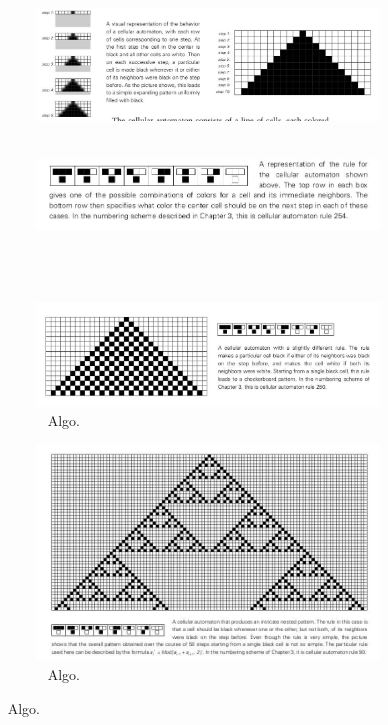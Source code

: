 \documentclass[16pt,spanish]{article}
\begin{document}
\begin{figure}[h!]
\begin{subfigure}[a]{0.5\linewidth}
\includegraphics[width=\linewidth]{imagesCA/Example-1-a.jpg}
\caption{~\cite{wolfram2002new}}
\end{subfigure}
\begin{subfigure}[b]{0.5\linewidth}
\includegraphics[width=\linewidth]{imagesCA/Example-1-b.jpg}
\caption{~\cite{wolfram2002new}}
\end{subfigure}
\end{figure}

\begin{figure}[h!]
\begin{subfigure}[c]{0.5\linewidth}
\includegraphics[width=\linewidth]{imagesCA/Example-2.jpg}
\caption{~\cite{wolfram2002new} Algo.}
\end{subfigure}
\begin{subfigure}[d]{0.5\linewidth}
\includegraphics[width=0.5\linewidth]{imagesCA/Example-3.jpg}
\caption{~\cite{wolfram2002new} Algo.}
\end{subfigure}
\end{figure}
\end{document}
